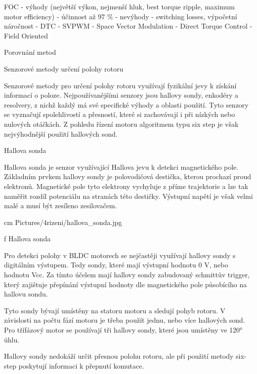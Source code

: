 \sec FOC 
    - výhody (největší výkon, nejmenší hluk, best torque ripple, maximum motor efficiency) - účinnost až 97 \% %
    - nevýhody - switching losses, výpočetní náročnost  
    - DTC
    - SVPWM
    - Space Vector Modulation
    - Direct Torque Control
    - Field Oriented

\sec Porovnání metod  

\sec Senzorové metody určení polohy rotoru

Senzorové metody pro určení polohy rotoru využívají fyzikální jevy k získání informací o poloze.
Nejpoužívanějšími senzory jsou hallovy sondy, enkodéry a resolvery, z nichž každý má své specifické výhody a oblasti použití.
Tyto senzory se vyznačují spolehlivostí a přesností, které si zachovávají i při nízkých nebo nulových otáčkách. Z pohledu řízení motoru
algoritmem typu six step je však nejvýhodnější použití hallových sond.

\secc Hallova sonda

Hallova sonda je senzor využívající Hallova jevu k detekci magnetického pole.
Základním prvkem hallovy sondy je polovodičová destička, kterou prochazí proud elektronů. 
Magnetické pole tyto elektrony vychyluje z příme trajektorie a lze tak naměřit rozdíl potenciálu na stranách této destičky.
Výstupní napětí je však velmi malé a musí být zesíleno zesilovačem.

\medskip
{} cm \cinspic Pictures/4rizeni/hallova_sonda.jpg 
\caption/f Hallova sonda 
\medskip

Pro detekci polohy v BLDC motorech se nejčastěji využívají hallovy sondy s digitálním výstupem. Tedy sondy, které mají 
výstupní hodnotu 0 V, nebo hodnotu Vcc. Za tímto účelem mají hallovy sondy zabudovaný schmittův trigger, který zajištuje 
přepínání výstupní hodnoty dle magnetického pole působícího na hallovu sondu.

Tyto sondy bývají umístěny na statoru motoru a sledují pohyb rotoru. V závislosti na počtu fází motoru je třeba použít
jednu, nebo více hallových sond. Pro třífázový motor se používají tři hallovy sondy, které jsou umístěny ve 120° úhlu.

Hallovy sondy nedokáží určit přesnou polohu rotoru, ale při použití metody six-step poskytují informaci k přepnutí komutace.




